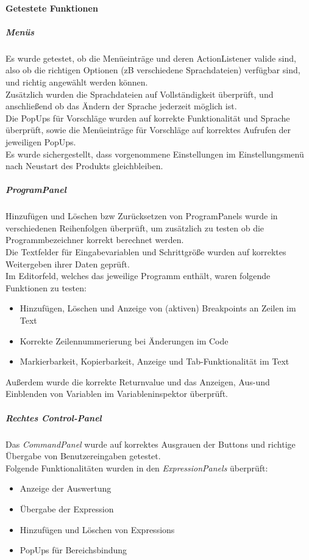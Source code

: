 \documentclass[parskip=full]{scrartcl}
\begin{document}
\paragraph{Getestete Funktionen}
\subparagraph{Menüs}
Es wurde getestet, ob die Menüeinträge und deren ActionListener valide sind, also ob die richtigen Optionen (zB verschiedene Sprachdateien) verfügbar sind, und richtig angewählt werden können.  \\
Zusätzlich wurden die Sprachdateien auf Vollständigkeit überprüft, und anschließend ob das Ändern der Sprache jederzeit möglich ist. \\
Die PopUps für Vorschläge wurden auf korrekte Funktionalität und Sprache überprüft, sowie die Menüeinträge für Vorschläge auf korrektes Aufrufen der jeweiligen PopUps. \\
Es wurde sichergestellt, dass vorgenommene Einstellungen im Einstellungsmenü nach Neustart des Produkts gleichbleiben.
\subparagraph{ProgramPanel}
Hinzufügen und Löschen bzw Zurücksetzen von ProgramPanels wurde in verschiedenen Reihenfolgen überprüft, um zusätzlich zu testen ob die Programmbezeichner korrekt berechnet werden. \\
Die Textfelder für Eingabevariablen und Schrittgröße wurden auf korrektes Weitergeben ihrer Daten geprüft. \\
Im Editorfeld, welches das jeweilige Programm enthält, waren folgende Funktionen zu testen:
\begin{itemize}
\item Hinzufügen, Löschen und Anzeige von (aktiven) Breakpoints an Zeilen im Text
\item Korrekte Zeilennummerierung bei Änderungen im Code
\item Markierbarkeit, Kopierbarkeit, Anzeige und Tab-Funktionalität im Text
\end{itemize}
Außerdem wurde die korrekte Returnvalue und das Anzeigen, Aus-und Einblenden von Variablen im Variableninspektor überprüft.
\subparagraph{Rechtes Control-Panel}
Das \textit{CommandPanel} wurde auf korrektes Ausgrauen der Buttons und richtige Übergabe von Benutzereingaben getestet. \\
Folgende Funktionalitäten wurden in den \textit{ExpressionPanels} überprüft:
\begin{itemize}
\item Anzeige der Auswertung
\item Übergabe der Expression
\item Hinzufügen und Löschen von Expressions
\item PopUps für Bereichsbindung
\end{itemize}
\end{document}
